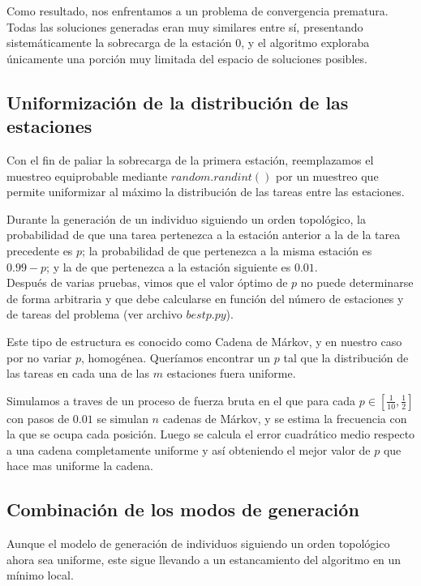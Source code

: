 \documentclass[12pt,a4paper]{report}
\begin{document}
Como resultado, nos enfrentamos a un problema de convergencia prematura. Todas las soluciones generadas eran muy similares entre sí, presentando sistemáticamente la sobrecarga de la estación $0$, y el algoritmo exploraba únicamente una porción muy limitada del espacio de soluciones posibles.


\subsection*{Uniformización de la distribución de las estaciones}

Con el fin de paliar la sobrecarga de la primera estación, reemplazamos el muestreo equiprobable mediante $random.randint()$ por un muestreo que permite uniformizar al máximo la distribución de las tareas entre las estaciones.

Durante la generación de un individuo siguiendo un orden topológico, la probabilidad de que una tarea pertenezca a la estación anterior a la de la tarea precedente es $p$; la probabilidad de que pertenezca a la misma estación es $0.99 - p$; y la de que pertenezca a la estación siguiente es $0.01$.\\ 
 
Después de varias pruebas, vimos que el valor óptimo de $p$ no puede determinarse de forma arbitraria y que debe calcularse en función del número de estaciones y de tareas del problema (ver archivo $bestp.py$).

Este tipo de estructura es conocido como Cadena de Márkov, y en nuestro caso por no variar $p$, homogénea. Queríamos encontrar un $p$ tal que la distribución de las tareas en cada una de las $m$ estaciones fuera uniforme.

Simulamos a traves de un proceso de fuerza bruta en el que para cada $p\in[\frac1 {10},\frac 1 2]$ con pasos de $0.01$ se simulan $n$ cadenas de Márkov, y se estima la frecuencia con la que se ocupa cada posición. Luego se calcula el error cuadrático medio respecto a una cadena completamente uniforme y así obteniendo el mejor valor de $p$ que hace mas uniforme la cadena.

\subsection*{Combinación de los modos de generación}

Aunque el modelo de generación de individuos siguiendo un orden topológico ahora sea uniforme, este sigue llevando a un estancamiento del algoritmo en un mínimo local.
\end{document}
